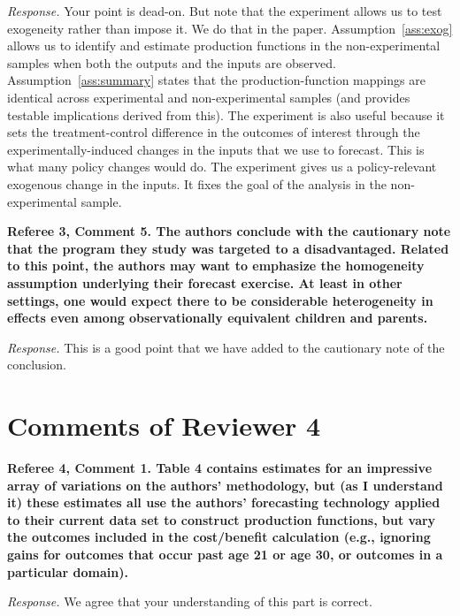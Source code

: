 \noindent \textit{Response.} Your point is dead-on. But note that the experiment allows us to test exogeneity rather than impose it. We do that in the paper. Assumption~\ref{ass:exog} allows us to identify and estimate production functions in the non-experimental samples when both the outputs and the inputs are observed. Assumption~\ref{ass:summary} states that the production-function mappings are identical across experimental and non-experimental samples (and provides testable implications derived from this). The experiment is also useful because it sets the treatment-control difference in the outcomes of interest through the experimentally-induced changes in the inputs that we use to forecast. This is what many policy changes would do. The experiment gives us a policy-relevant exogenous change in the inputs. It fixes the goal of the analysis in the non-experimental sample.

\noindent \textbf{Referee 3, Comment 5. The authors conclude with the cautionary note that the program they study was targeted to a disadvantaged. Related to this point, the authors may want to emphasize the homogeneity assumption underlying their forecast exercise. At least in other settings, one would expect there to be considerable heterogeneity in effects even among observationally equivalent children and parents.}

\noindent \textit{Response.} This is a good point that we have added to the cautionary note of the conclusion.

\section*{Comments of Reviewer 4}

\noindent \textbf{Referee 4, Comment 1. Table 4 contains estimates for an impressive array of variations on the authors' methodology, but (as I understand it) these estimates all use the authors' forecasting technology applied to their current data set to construct production functions, but vary the outcomes included in the cost/benefit calculation (e.g., ignoring gains for outcomes that occur past age 21 or age 30, or outcomes in a particular domain).}

\noindent \textit{Response.} We agree that your understanding of this part is correct.
 
